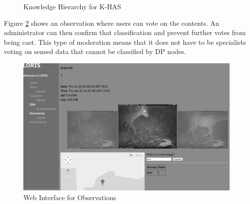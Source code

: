 		\begin{figure}[!h]
			\centering
			\caption{Knowledge Hierarchy for K-HAS}
			\label{arch:kno:hier}
		\end{figure}
		
		Figure \ref{kc:loris} shows an observation where users can vote on the contents. An administrator can then confirm that classification and prevent further votes from being cast. This type of moderation means that it does not have to be specialists voting on sensed data that cannot be classified by DP nodes.
		
		\begin{figure}[h]
		\centering
		\includegraphics[width=\textwidth]{Chap4/figures/loris}
		\caption{Web Interface for Observations}
		\label{kc:loris}
		\end{figure}
		
